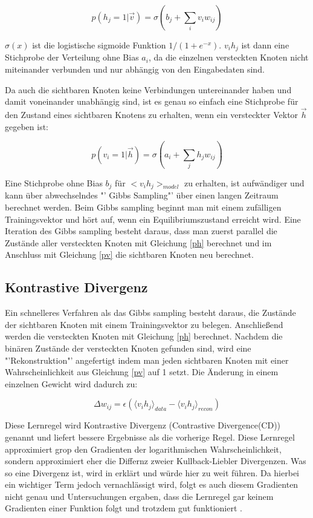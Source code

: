\documentclass[12pt]{article}
\begin{document}
\begin{equation}
p(h_j = 1 | \vec{v}) = \sigma (b_j + \sum_{i} v_i w_{ij})
\label{ph}
\end{equation}

$\sigma(x)$ ist die logistische sigmoide Funktion $1/(1+e^{-x})$. $v_ih_j$ ist dann eine Stichprobe der Verteilung ohne Bias $a_i$, da die einzelnen versteckten Knoten nicht miteinander verbunden und nur abhängig von den Eingabedaten sind.

Da auch die sichtbaren Knoten keine Verbindungen untereinander haben und damit voneinander unabhängig sind, ist es genau so einfach eine Stichprobe für den Zustand eines sichtbaren Knotens zu erhalten, wenn ein versteckter Vektor $\vec{h}$ gegeben ist:

\begin{equation}
p(v_i =1 | \vec{h}) = \sigma (a_i + \sum_{j} h_j w_{ij})
\label{pv}
\end{equation}

Eine Stichprobe ohne Bias $b_j$ für $<v_i h_j>_{model}$ zu erhalten, ist aufwändiger und kann über abwechselndes "' Gibbs Sampling"' über einen langen Zeitraum berechnet werden. Beim Gibbs sampling beginnt man mit einem zufälligen Trainingsvektor und hört auf, wenn ein Equilibriumszustand erreicht wird. Eine Iteration des Gibbs sampling besteht daraus, dass man zuerst parallel die Zustände aller versteckten Knoten mit Gleichung \ref{ph} berechnet und im Anschluss mit Gleichung \ref{pv} die sichtbaren Knoten neu berechnet.

\subsection{Kontrastive Divergenz}

Ein schnelleres Verfahren als das Gibbs sampling besteht daraus, die Zustände der sichtbaren Knoten mit einem Trainingsvektor zu belegen. Anschließend werden die versteckten Knoten mit Gleichung \ref{ph} berechnet. Nachdem die binären Zustände der versteckten Knoten gefunden sind, wird eine "'Rekonstruktion"' angefertigt indem man jeden sichtbaren Knoten mit einer Wahrscheinlichkeit aus Gleichung \ref{pv} auf 1 setzt. Die Änderung in einem einzelnen Gewicht wird dadurch zu:

\begin{equation}
\Delta w_{ij} = \epsilon \left( \langle v_i h_j\rangle_{data} - \langle v_i h_j \rangle_{recon}\right)
\end{equation}

Diese Lernregel wird Kontrastive Divergenz (Contrastive Divergence(CD)) genannt und liefert bessere Ergebnisse als die vorherige Regel. Diese Lernregel approximiert grop den  Gradienten der logarithmischen Wahrscheinlichkeit, sondern approximiert eher die Differnz zweier Kullback-Liebler Divergenzen. Was so eine Divergenz ist, wird in \cite{KLD} erklärt und würde hier zu weit führen. Da hierbei ein wichtiger Term jedoch vernachlässigt wird, folgt es auch diesem Gradienten nicht genau und Untersuchungen ergaben, dass die Lernregel gar keinem Gradienten einer Funktion folgt und trotzdem gut funktioniert \cite{noconv}. 
\end{document}
